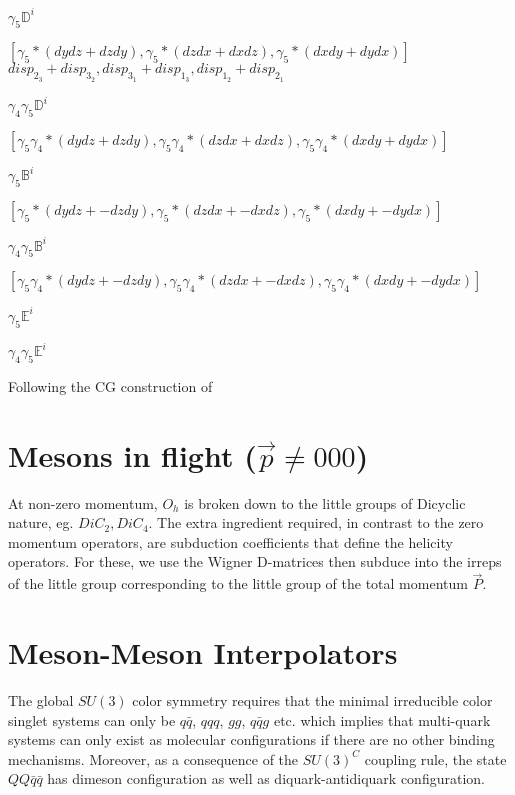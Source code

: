 \begin{table}
$\gamma_5\mathbb{D}^i$

$[\gamma_5 * (dydz + dzdy), \gamma_5 * (dzdx + dxdz), \gamma_5 * (dxdy + dydx)]$
$disp_{2_3}+ disp_{3_2}, disp_{3_1} + disp_{1_3}, disp_{1_2} + disp_{2_1}$

$\gamma_4\gamma_5\mathbb{D}^i$

$[\gamma_5\gamma_4 * (dydz + dzdy), \gamma_5\gamma_4 * (dzdx + dxdz), \gamma_5\gamma_4 * (dxdy + dydx)]$

$\gamma_5\mathbb{B}^i$

$[\gamma_5 * (dydz + -dzdy), \gamma_5 * (dzdx + -dxdz), \gamma_5 * (dxdy + -dydx)]$

$\gamma_4\gamma_5\mathbb{B}^i$

$[\gamma_5\gamma_4 * (dydz + -dzdy), \gamma_5\gamma_4 * (dzdx + -dxdz), \gamma_5\gamma_4 * (dxdy + -dydx)]$

$\gamma_5\mathbb{E}^i$

$\gamma_4\gamma_5\mathbb{E}^i$



Following the CG construction of \cite{Basak_2005}

\section{Mesons in flight ($\vec{p}\neq 000$)}

At non-zero momentum, $O_h$ is broken down to the little groups of Dicyclic nature, eg. $DiC_2, DiC_4$. The extra ingredient required, in contrast to the zero momentum operators, are subduction coefficients that define the helicity operators. For these, we use the Wigner D-matrices then subduce into the irreps of the little group corresponding to the little group of the total momentum $\vec{P}$. 

\section{Meson-Meson Interpolators}
The global $SU(3)$ color symmetry requires that the minimal irreducible color singlet systems can only be $q\bar{q}$, $qqq$, $gg$, $q\bar{q}g$ etc. which implies that multi-quark systems can only exist as molecular configurations if there are no other binding mechanisms. Moreover, as a consequence of the $SU(3)^C$ coupling rule, the state $QQ\bar{q}\bar{q}$ has dimeson configuration as well as diquark-antidiquark configuration. 


\end{table}
